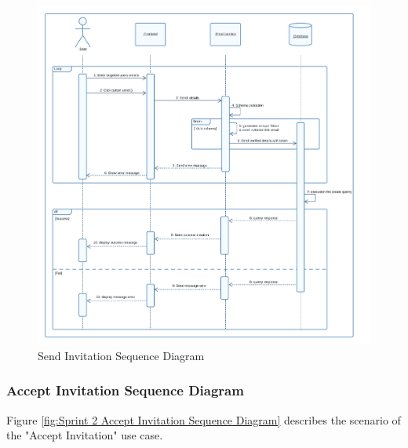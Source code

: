 \begin{figure}[ht]
	\centering
	\includegraphics[width=\linewidth]{Images/sprint2/send invitation seq diag.png}
	\caption{ Send Invitation Sequence Diagram}
	\label{fig:Sprint 2 Send Invitation Sequence Diagram}
\end{figure}


\clearpage
\subsubsection{Accept Invitation Sequence Diagram}

Figure \ref{fig:Sprint 2 Accept Invitation Sequence Diagram} describes the scenario of the "Accept Invitation" use case.

